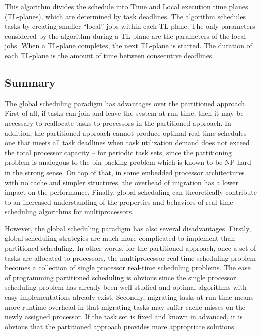 \documentclass[preprint,12pt]{elsarticle}
\begin{document}
 This algorithm divides the schedule into Time and Local execution time planes
 (TL-planes), which are determined by task deadlines. The algorithm schedules
 tasks by creating smaller “local” jobs within each TL-plane. The only
 parameters considered by the algorithm during a TL-plane are the parameters
 of the local jobs. When a TL-plane completes, the next TL-plane is started.
 The duration of each TL-plane is the amount of time between consecutive
 deadlines.

\subsection{Summary}
The global scheduling paradigm has advantages over the partitioned approach. 
First of all, if tasks can join and leave the system at run-time, then it may be
necessary to reallocate tasks to processors in the partitioned approach.
In addition, the partitioned approach cannot produce optimal
real-time schedules -- one that meets all task deadlines
when task utilization demand does not exceed the total processor
capacity -- for periodic task sets, since the partitioning
problem is analogous to the bin-packing problem which is known to be NP-hard
in the strong sense. 
On top of that, in some embedded processor architectures with no cache and
simpler structures, the overhead of migration has a lower
impact on the performance. 
Finally, global scheduling can theoretically contribute to an increased
understanding of the properties and behaviors of real-time scheduling
algorithms for multiprocessors.

However, the global scheduling paradigm has also several disadvantages. 
Firstly, global scheduling strategies are much more complicated to implement than
partitioned scheduling. 
In other words, for the partitioned approach, once a set of tasks are allocated
to processors, the multiprocessor real-time scheduling problem becomes a
collection of single processor real-time scheduling problems.  The ease of
programming partitioned scheduling is obvious since the single processor
scheduling problem has already been well-studied and optimal algorithms with
easy implementations already exist.
Secondly, migrating tasks at run-time means more runtime overhead in that
migrating tasks may suffer cache misses on the newly assigned processor. If
the task set is fixed and known in advanced, it is obvious that the partitioned
approach provides more appropriate solutions.
\end{document}
